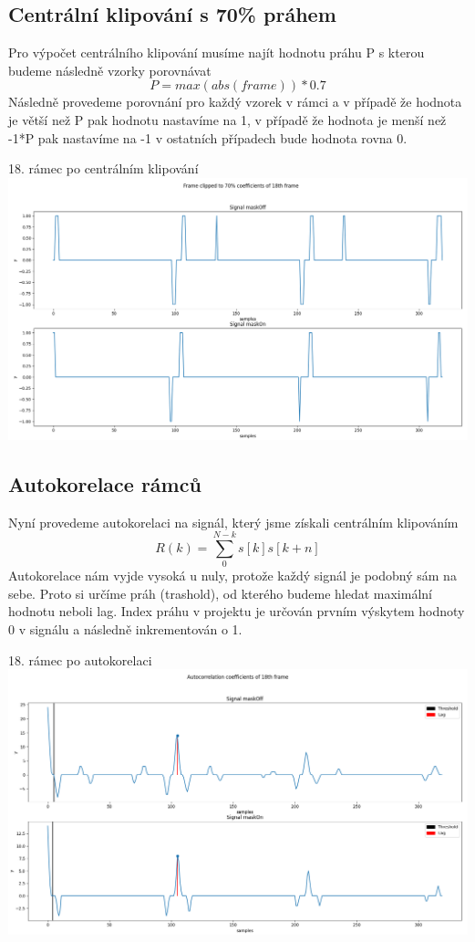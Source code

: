 \documentclass[12pt,czech]{article}
\begin{document}
    \subsection{Centrální klipování s 70\% práhem}
        Pro výpočet centrálního klipování musíme najít hodnotu práhu P s kterou budeme následně vzorky porovnávat
        \[ P = max(abs(frame))*0.7\]
        Následně provedeme porovnání pro každý vzorek v rámci a v případě že hodnota je větší než P pak hodnotu nastavíme na 1, v případě že hodnota je menší než -1*P pak nastavíme na -1 v ostatních případech bude hodnota rovna 0.
        \begin{center}
            18. rámec po centrálním klipování
            \hfill\includegraphics[scale=0.48]{images/18thframe_clipping.png}\hspace*{\fill}
        \end{center}
    \clearpage
    \subsection{Autokorelace rámců}
        Nyní provedeme autokorelaci na signál, který jsme získali centrálním klipováním
        \[ R(k) = \sum_{0}^{N-k} s[k]s[k+n] \]
        Autokorelace nám vyjde vysoká u nuly, protože každý signál je podobný sám na sebe. Proto si určíme práh (trashold), od kterého budeme hledat maximální hodnotu neboli lag. Index práhu v projektu je určován prvním výskytem hodnoty 0 v signálu a následně inkrementován o 1.
        \begin{center}
            18. rámec po autokorelaci
            \hfill\includegraphics[scale=0.48]{images/18thframe_autocorrelation.png}\hspace*{\fill}
        \end{center}
    \clearpage
\end{document}
